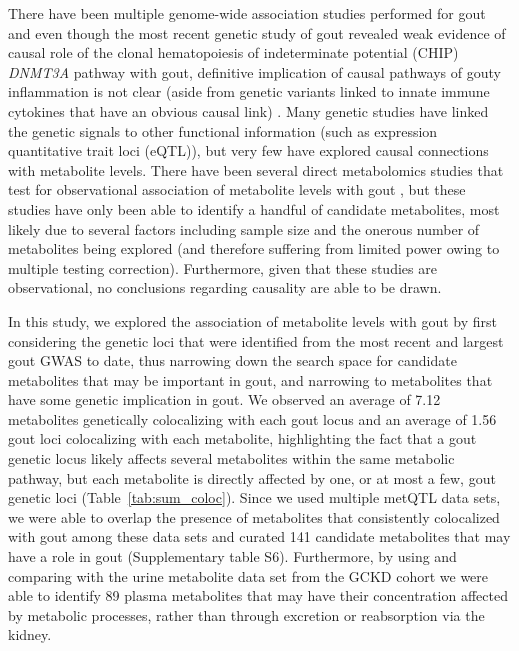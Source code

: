 \documentclass[gucdd,article,submit,pdftex,moreauthors]{Definitions/mdpi}
\begin{document}
There have been multiple genome-wide association studies performed for gout \citep{tin_target_2019,major_genome-wide_2024,li_replication_2017,nakayama_subtype-specific_2020,kawamura_genome-wide_2019,zhou_global_2022} and even though the most recent genetic study of gout \citep{major_genome-wide_2024} revealed weak evidence of causal role of the clonal hema\-topoiesis of indeterminate potential (CHIP) \textit{DNMT3A} pathway with gout, definitive implication of causal pathways of gouty inflammation is not clear (aside from genetic variants linked to innate immune cytokines that have an obvious causal link) \citep{major_genome-wide_2024}.
Many genetic studies have linked the genetic signals to other functional information (such as expression quantitative trait loci (eQTL)), but very few have explored causal connections with metabolite levels.
There have been several direct metabolomics studies that test for observational association of metabolite levels with gout \citep{renaudin_gout_2020,lyu_metabolomics_2022,joshi_prediagnostic_2023}, but these studies have only been able to identify a handful of candidate metabolites, most likely due to several factors including sample size and the onerous number of metabolites being explored (and therefore suffering from limited power owing to multiple testing correction).
Furthermore, given that these studies are observational, no conclusions regarding causality are able to be drawn.

In this study, we explored the association of metabolite levels with gout by first considering the genetic loci that were identified from the most recent and largest gout GWAS to date, thus narrowing down the search space for candidate metabolites that may be important in gout, and narrowing to metabolites that have some genetic implication in gout.
We observed an average of 7.12 metabolites genetically colocalizing with each gout locus and an average of 1.56 gout loci colocalizing with each metabolite, highlighting the fact that a gout genetic locus likely affects several metabolites within the same metabolic pathway, but each metabolite is directly affected by one, or at most a few, gout genetic loci (Table~\ref{tab:sum_coloc}).
Since we used multiple metQTL data sets, we were able to overlap the presence of metabolites that consistently colocalized with gout among these data sets and curated 141 candidate metabolites that may have a role in gout (Supplementary table S6).
Furthermore, by using and comparing with the urine metabolite data set from the GCKD cohort we were able to identify 89 plasma metabolites that may have their concentration affected by metabolic processes, rather than through excretion or reabsorption via the kidney.
\end{document}
